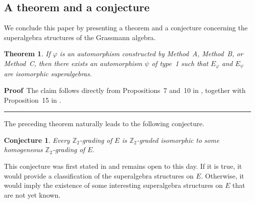 \documentclass{article}
\newtheorem{theorem}{Theorem}
\newtheorem{conjectura}{Conjecture}
\newenvironment{proof}[1][Proof]{\noindent\textbf{#1\,} }{\hfill \rule{0.5em}{0.5em}\medskip}
\begin{document}
	
	
	\subsection{A theorem and a conjecture}
	
	
	We conclude this paper by presenting a theorem and a conjecture concerning the superalgebra structures of the Grassmann algebra.
	
	\begin{theorem}
		If $\varphi$ is an automorphism constructed by Method~A, Method~B, or Method~C, then there exists an automorphism $\psi$ of type~1 such that $E_{\varphi}$ and $E_{\psi}$ are isomorphic superalgebras.
	\end{theorem}
	\begin{proof}
		The claim follows directly from Propositions~7 and~10 in \cite{agpkauto}, together with Proposition~15 in \cite{anagomes}.
	\end{proof}
	
	
	
	
	
	The preceding theorem naturally leads to the following conjecture.
	
	\begin{conjectura}
		Every $\mathbb{Z}_{2}$-grading of $E$ is $\mathbb{Z}_{2}$-graded isomorphic to some homogeneous $\mathbb{Z}_{2}$-grading of $E$.
	\end{conjectura}
	
	This conjecture was first stated in \cite{anagomes} and remains open to this day. If it is true, it would provide a classification of the superalgebra structures on $E$. Otherwise, it would imply the existence of some interesting superalgebra structures on $E$ that are not yet known.
	
\end{document}
